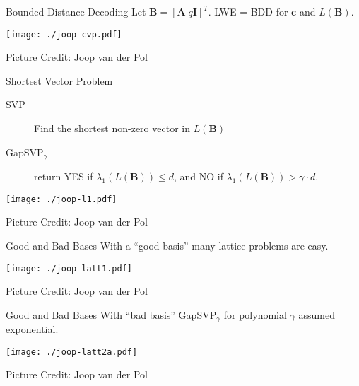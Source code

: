 \documentclass[presentation,smaller]{beamer}
\renewcommand{\vec}[1]{\ensuremath{\mathbf{#1}}\xspace}
\begin{document}
\begin{frame}[label={sec:org672584c}]{Bounded Distance Decoding}
Let \(\vec{B} = [\vec{A} | q\vec{I}]^T\). LWE = BDD for \(\vec{c}\) and \(L(\vec{B})\).

\begin{center}
\texttt{[image: ./joop-cvp.pdf]}
\end{center}

\tiny Picture Credit: Joop van der Pol
\end{frame}


\begin{frame}[label={sec:org00d448d}]{Shortest Vector Problem}
\begin{description}
\item[{SVP}] Find the shortest non-zero vector in \(L(\vec{B})\)
\item[{GapSVP\(_γ\)}] return YES if \(λ_1(L(\vec{B})) ≤ d\), and NO if \(λ_1(L(\vec{B})) > γ⋅d\).
\end{description}

\begin{center}
\begin{center}
\texttt{[image: ./joop-l1.pdf]}
\end{center}
\end{center}

\tiny Picture Credit: Joop van der Pol
\end{frame}

\begin{frame}[label={sec:org27e262e}]{Good and Bad Bases}
With a “good basis” many lattice problems are easy.

\begin{center}
\begin{center}
\texttt{[image: ./joop-latt1.pdf]}
\end{center}
\end{center}

\tiny Picture Credit: Joop van der Pol
\end{frame}


\begin{frame}[label={sec:org59a9dc6}]{Good and Bad Bases}
With “bad basis” GapSVP\(_γ\) for polynomial \(γ\) assumed exponential.

\begin{center}
\begin{center}
\texttt{[image: ./joop-latt2a.pdf]}
\end{center}
\end{center}

\tiny Picture Credit: Joop van der Pol
\end{frame}
\end{document}
